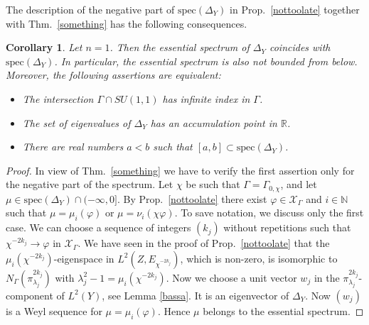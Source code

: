 \documentclass[10]{amsart}
\newtheorem{cor}[thm]{Corollary}
\theoremstyle{remark}
\theoremstyle{definition}
\numberwithin{equation}{section}
\newcommand{\R}{\mathbb{R}}           %
\newcommand{\N}{\mathbb{N}}           %
\newcommand{\spec}{{\mathrm{spec}}}
\newcommand{\vp}{\varphi}
\newcommand{\Cal}{\mathcal}
\begin{document}
{The description of the negative part of $\spec(\Delta_Y)$ in Prop.~\ref{nottoolate} together with Thm.~\ref{something} has the following consequences.

\begin{cor}\label{late}
Let $n=1$. Then the essential spectrum of $\Delta_Y$ coincides with $\spec(\Delta_Y)$. In particular, the essential spectrum is also not bounded from below. Moreover, the following assertions are
equivalent:
\begin{itemize}
\item[(i)] The intersection $\Gamma\cap SU(1,1)$ has infinite index in $\Gamma$.
\item[(ii)] The set of eigenvalues of $\Delta_Y$ has an accumulation point in $\R$.
\item[(iii)] There are real numbers $a<b$ such that $[a,b]\subset \spec(\Delta_Y)$.
\end{itemize}
\end{cor}
\begin{proof} 
In view of  Thm.~\ref{something} we have to verify the first assertion only for the negative part of the spectrum. Let $\chi$ be such that $\Gamma=\Gamma_{0,\chi}$, and let $\mu\in\spec (\Delta_Y)\cap (-\infty,0]$.
 By Prop.~\ref{nottoolate} 
there exist $\vp\in{\Cal X}_\Gamma$ and $i\in\N$ such that
$\mu=\mu_i(\vp)$ or $\mu=\nu_i(\chi\vp)$. To save notation, we discuss only the first case. We can choose a sequence of integers $(k_j)$ without repetitions such that
$\chi^{-2k_j}\to\vp$ in ${\Cal X}_\Gamma$. We have seen in the proof of  Prop.~\ref{nottoolate} that the $\mu_i(\chi^{-2k_j})$-eigenspace in $L^2(Z,E_{\chi^{-2k_j}})$, which is non-zero, is isomorphic to $N_\Gamma(\pi_{\lambda_j}^{2k_j})$ with $\lambda_j^2-1=\mu_i(\chi^{-2k_j})$. Now we choose a unit vector $w_j$ in the $\pi_{\lambda_j}^{2k_j}$-component of $L^2(Y)$, see Lemma \ref{bassa}.  It is an eigenvector of $\Delta_Y$. Now $(w_j)$ is a Weyl sequence for $\mu=\mu_i(\vp)$. Hence $\mu$ belongs to the
essential spectrum.


\end{proof}}
\end{document}
